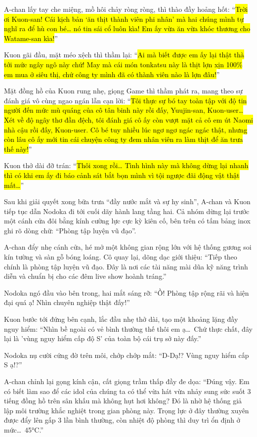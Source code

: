 \documentclass[../main.tex]{subfiles}
\begin{document}
A-chan lấy tay che miệng, mồ hôi chảy ròng ròng, thì thào đầy hoảng hốt: ``\hl{Trời ơi Kuon-san! Cái kịch bản `ăn thịt thành viên phi nhân' mà hai chúng mình tự nghĩ ra để hù con bé\dots{} nó tin sái cổ luôn kìa! Em ấy vừa ăn vừa khóc thương cho Watame-san kìa!}''

Kuon gãi đầu, mặt méo xệch thì thầm lại: ``\hl{Ai mà biết được em ấy lại thật thà tới mức ngây ngô này chứ! May mà cái món tonkatsu này là thịt lợn xịn 100\% em mua ở siêu thị, chứ công ty mình đã có thành viên nào là lợn đâu!}''

Mặt đồng hồ của Kuon rung nhẹ, giọng Game thì thầm phát ra, mang theo sự đánh giá vô cùng ngao ngán lẫn cạn lời: ``\hl{Tôi thực sự bó tay toàn tập với độ tin người đến mức mù quáng của cô tân binh này rồi đấy, Yuujin-san, Kuon-user\dots{} Xét về độ ngây thơ đần đệch, tôi đánh giá cô ấy còn vượt mặt cả cô em út Naomi nhà cậu rồi đấy, Kuon-user. Cô bé tuy nhiều lúc ngơ ngơ ngác ngác thật, nhưng còn lâu cô ấy mới tin cái chuyện công ty đem nhân viên ra làm thịt để ăn trưa thế này!}''

Kuon thở dài đỡ trán: ``\hl{Thôi xong rồi\dots{} Tình hình này mà không dừng lại nhanh thì có khi em ấy đi báo cảnh sát bắt bọn mình vì tội ngược đãi động vật thật mất\dots}''

\ct

Sau khi giải quyết xong bữa trưa ``đầy nước mắt và sự hy sinh'', A-chan và Kuon tiếp tục dẫn Nodoka đi tới cuối dãy hành lang tầng hai. Cả nhóm dừng lại trước một cánh cửa đôi bằng kính cường lực cực kỳ kiên cố, bên trên có tấm bảng inox ghi rõ dòng chữ: ``Phòng tập luyện vũ đạo''.

A-chan đẩy nhẹ cánh cửa, hé mở một không gian rộng lớn với hệ thống gương soi kín tường và sàn gỗ bóng loáng. Cô quay lại, dõng dạc giới thiệu: ``Tiếp theo chính là phòng tập luyện vũ đạo. Đây là nơi các tài năng mài dũa kỹ năng trình diễn và chuẩn bị cho các đêm live show hoành tráng.''

Nodoka ngó đầu vào bên trong, hai mắt sáng rỡ: ``Ồ! Phòng tập rộng rãi và hiện đại quá ạ! Nhìn chuyên nghiệp thật đấy!''

Kuon bước tới đứng bên cạnh, lắc đầu nhẹ thở dài, tạo một khoảng lặng đầy nguy hiểm: ``Nhìn bề ngoài có vẻ bình thường thế thôi em ạ\dots\ Chứ thực chất, đây lại là 'vùng nguy hiểm cấp độ S' của toàn bộ cái trụ sở này đấy.''

Nodoka nụ cười cứng đờ trên môi, chớp chớp mắt: ``D-Dạ!? Vùng nguy hiểm cấp S ạ!?''

A-chan chỉnh lại gọng kính cận, cất giọng trầm thấp đầy đe dọa: ``Đúng vậy. Em có biết làm sao để các idol của chúng ta có thể vừa hát vừa nhảy sung sức suốt 3 tiếng đồng hồ trên sân khấu mà không hụt hơi không? Đó là nhờ hệ thống giả lập môi trường khắc nghiệt trong gian phòng này. Trọng lực ở đây thường xuyên được đẩy lên gấp 3 lần bình thường, còn nhiệt độ phòng thì duy trì ổn định ở mức\dots\ 45°C.''
\end{document}
